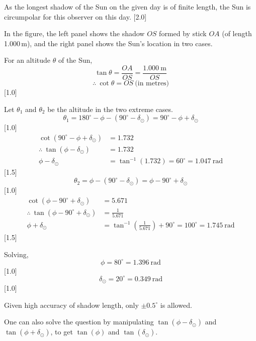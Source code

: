 As the longest shadow of the Sun on the given day is of finite length, the
Sun is circumpolar for this observer on this day. \hfill[2.0]

In the figure, the left panel shows the shadow $OS$ formed by stick $OA$ (of
length 1.000\,m), and the right panel shows the Sun's location in two cases.

For an altitude $\theta$ of the Sun,
\[ \tan\theta = \frac{OA}{OS} = \frac{1.000\ \mathrm{m}}{OS} \]
\[ \therefore\ \cot\theta = OS\ \text{(in metres)} \]
\hfill[1.0]

Let $\theta_1$ and $\theta_2$ be the altitude in the two extreme cases.
\[ \theta_1 = 180^\circ - \phi - (90^\circ - \delta_\odot)
   = 90^\circ - \phi + \delta_\odot \]
\hfill[1.0]
\begin{align*}
\cot(90^\circ - \phi + \delta_\odot) &= 1.732\\
\therefore\ \tan(\phi - \delta_\odot) &= 1.732\\
\phi - \delta_\odot &= \tan^{-1}(1.732) = 60^\circ = 1.047\ \mathrm{rad}
\end{align*}
\hfill[1.5]
\[ \theta_2 = \phi - (90^\circ - \delta_\odot)
   = \phi - 90^\circ + \delta_\odot \]
\hfill[1.0]
\begin{align*}
\cot(\phi - 90^\circ + \delta_\odot) &= 5.671\\
\therefore\ \tan(\phi - 90^\circ + \delta_\odot) &= \frac{1}{5.671}\\
\phi + \delta_\odot &= \tan^{-1}\left(\frac{1}{5.671}\right) + 90^\circ
  = 100^\circ = 1.745\ \mathrm{rad}
\end{align*}
\hfill[1.5]

Solving,
\[ \boxed{\phi = 80^\circ} = 1.396\ \mathrm{rad} \]
\hfill[1.0]
\[ \boxed{\delta_\odot = 20^\circ} = 0.349\ \mathrm{rad} \]
\hfill[1.0]

Given high accuracy of shadow length, only $\pm 0.5^\circ$ is allowed.

One can also solve the question by manipulating $\tan(\phi - \delta_\odot)$
and $\tan(\phi + \delta_\odot)$, to get $\tan(\phi)$ and $\tan(\delta_\odot)$.
